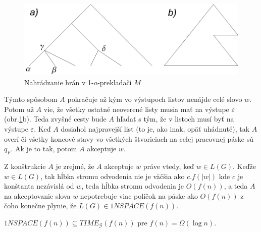 \begin{dokaz}
\begin{figure}[!ht]
\centering
\includegraphics{img/gsystems/nstrom}
\caption{Nahrádzanie hrán v 1-$a$-prekladači $M$} \label{gs_obr_nstrom}
\end{figure}

Týmto spôsobom $A$ pokračuje až kým vo výstupoch listov nenájde
celé slovo $w$. Potom už $A$ vie, že všetky ostatné neoverené
listy musia mať na výstupe $\varepsilon$ (obr.\ref{gs_obr_nstrom}b). Teda
zvyšné cesty bude $A$ hľadať s tým, že v listoch musí byť na
výstupe $\varepsilon$. Keď $A$ dosiahol najpravejší list (to je,
ako inak, opäť uhádnuté), tak $A$ overí či všetky koncové stavy vo
všetkých štvoriciach na celej pracovnej páske sú $q_F$. Ak je to
tak, potom $A$ akceptuje $w$.

Z konštrukcie $A$ je zrejmé, že $A$ akceptuje $w$ práve vtedy, keď
$w\in L(G)$. Keďže $w\in L(G)$, tak hĺbka stromu odvodenia nie je
väčšia ako $c.f(|w|)$ kde $c$ je konštanta nezávislá od $w$, teda
hĺbka stromu odvodenia je $O(f(n))$, a teda $A$ na akceptovanie
slova $w$ nepotrebuje viac políčok na páske ako $O(f(n))$ z čoho
konečne plynie, že $L(G)\in 1NSPACE(f(n))$.
\end{dokaz}

\begin{lema}
$1NSPACE(f(n))\subseteq TIME_{\mathcal{G}}(f(n))$ pre $f(n)=\Omega
(\log n)$.
\end{lema}

